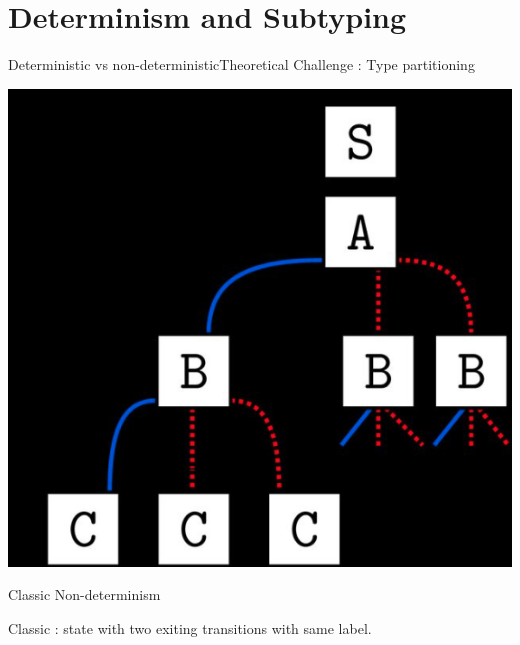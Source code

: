\section{Determinism and Subtyping}

{  %
\begin{frame}{Deterministic vs non-deterministic}{Theoretical Challenge : Type partitioning}
  \centering
  
  \includegraphics[height=0.8\textheight]{determ.png} 
\end{frame}
}

\begin{frame}{Classic Non-determinism}
  \centering
  
  \scalebox{0.95}{}

  Classic : state with two exiting transitions with same label.

\end{frame}

